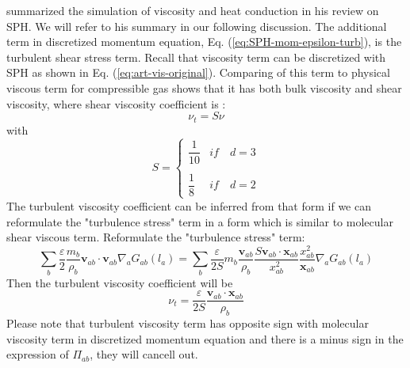 \documentclass[journal abbreviation, manuscript]{copernicus}
\begin{document}
\citet{monaghan2005smoothed} summarized the simulation of viscosity and heat conduction in his review on SPH. We will refer to his summary in our following discussion. The additional term in discretized momentum equation, Eq. (\ref{eq:SPH-mom-epsilon-turb}), is the turbulent shear stress term. 
Recall that viscosity term can be discretized with SPH as shown in Eq. (\ref{eq:art-vis-original}). 
Comparing of this term to physical viscous term for compressible gas shows that it has both bulk viscosity and shear viscosity, where shear viscosity coefficient is \citep{monaghan2005smoothed}:
\begin{equation}
\nu_t = S \nu
\end{equation}
with
\begin{equation}
S= 
\begin{cases} 
      \dfrac{1}{10} & if  \quad d=3 \\
      \\
     \dfrac{1}{8}  & if  \quad d=2 
\end{cases}
\end{equation}
The turbulent viscosity coefficient can be inferred from that form if we can reformulate the "turbulence stress" term in a form which is similar to molecular shear viscous term.
Reformulate the "turbulence stress" term:
\begin{equation}
 \sum_b \dfrac{\varepsilon}{2} \dfrac{m_b}{\rho_b} \textbf{v}_{ab} \cdot \textbf{v}_{ab} \nabla_a G_{ab}(l_a)= \sum_b \dfrac{\varepsilon}{2S} m_b \dfrac{\textbf{v}_{ab}}{\rho_b} \dfrac{S \textbf{v}_{ab} \cdot \textbf{x}_{ab}}{x_{ab}^2} \dfrac{x_{ab}^2}{\textbf{x}_{ab}} \nabla_a G_{ab}(l_a) 
\end{equation}
Then the turbulent viscosity coefficient will be
\begin{equation}
\nu_t = \dfrac{\varepsilon}{2S} \dfrac{\textbf{v}_{ab} \cdot \textbf{x}_{ab}}{\rho_b}
\end{equation}
Please note that turbulent viscosity term has opposite sign with molecular viscosity term in discretized momentum equation and there is a minus sign in the expression of $\Pi_{ab}$, they will cancell out.
\end{document}
